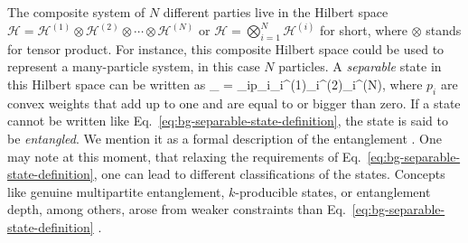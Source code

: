 The composite system of $N$ different parties live in the Hilbert space $\mathcal{H} = \mathcal{H}^{(1)}\otimes\mathcal{H}^{(2)}\otimes\cdots\otimes\mathcal{H}^{(N)}$ or $\mathcal{H} = \bigotimes_{i=1}^N\mathcal{H}^{(i)}$ for short, where $\otimes$ stands for tensor product.
For instance, this composite Hilbert space could be used to represent a many-particle system, in this case $N$ particles.
A \emph{separable} state in this Hilbert space can be written as
\be
  \label{eq:bg-separable-state-definition}
  \rho_{} = \sum_{i}p_i\rho_i^{(1)}\otimes\rho_i^{(2)}\otimes\cdots\otimes\rho_i^{(N)},
\ee
where $p_i$ are convex weights that add up to one and are equal to or bigger than zero.
If a state cannot be written like Eq.~\eqref{eq:bg-separable-state-definition}, the state is said to be \emph{entangled}.
We mention it as a formal description of the entanglement \citep{Guehne2009, Luis2004}.
One may note at this moment, that relaxing the requirements of Eq.~\eqref{eq:bg-separable-state-definition}, one can lead to different classifications of the states.
Concepts like genuine multipartite entanglement, $k$-producible states, or entanglement depth, among others, arose from weaker constraints than Eq.~\eqref{eq:bg-separable-state-definition} \citep{Guehne2009, Luis2004}.

